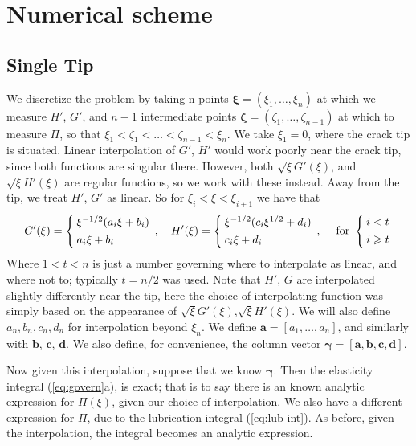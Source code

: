 \documentclass{jfm}
\begin{document}
\section{Numerical scheme}\label{sec:numerical_scheme}
%
%
\subsection{Single Tip}
We discretize the problem by taking n points $\boldsymbol{\xi} = (\xi_1, \dots
,\xi_n)$ at which we measure $H'$, $G'$, and $n-1$ intermediate points 
$\boldsymbol{\zeta} = (\zeta_1, \dots , \zeta_{n-1})$ at which to measure
$\Pi$, so that $\xi_1 < \zeta_1 < \dots < \zeta_{n-1} < \xi_n$. We take
$\xi_1 = 0$, where the crack tip is situated.
Linear interpolation of $G'$, $H'$ would work poorly near the crack tip, since
both functions are singular there. However, both $\sqrt{\xi}G'(\xi)$, and
$\sqrt{\xi}H'(\xi)$ are regular functions, so we work with these instead.
Away from the tip, we treat $H'$, $G'$ as linear. So for 
$\xi_{i} < \xi < \xi_{i+1}$ we have that
\begin{equation}
\setlength{\arraycolsep}{2pt}
G'(\xi) = \left\{ \begin{array}{l}  
\xi^{-1/2}(a_i \xi + b_i) \\[4pt]
a_i \xi + b_i
 \end{array}\right., \quad
H'(\xi) = \left\{ \begin{array}{l}  
\xi^{-1/2}(c_i \xi^{1/2} + d_i) \\[4pt]
c_i \xi + d_i
 \end{array}\right. , \quad
\; \mbox{for\ } \left\{ \begin{array}{l}  
i<t\\[4pt]
i\geq t
\end{array}\right.
\end{equation}
Where $1 < t < n$ is just a number governing where to interpolate as linear, and
where not to; typically $t = n/2$ was used. Note that $H'$, $G$ are interpolated
slightly differently near the tip, here the choice of interpolating function 
was simply based on the appearance of $\sqrt{\xi}G'(\xi)$,$\sqrt{\xi}H'(\xi)$.
We will also define $a_n,b_n,c_n,d_n$ for interpolation beyond $\xi_n$.
We define $\boldsymbol{a} = [a_1,\dots ,a_n]$, and similarly with 
$\boldsymbol{b}$, $\boldsymbol{c}$, $\boldsymbol{d}$. We also define,
for convenience, the column vector $\boldsymbol{\gamma}=[\boldsymbol{a},
\boldsymbol{b},\boldsymbol{c},\boldsymbol{d}]$.

Now given this interpolation, suppose that we know $\boldsymbol{\gamma}$.
Then the elasticity integral (\ref{eq:govern}a), is exact; 
that is to say there is an known analytic expression for $\Pi(\xi)$, given 
our choice of interpolation.
We also have a different expression for $\Pi$, due to the lubrication integral
(\ref{eq:lub-int}).
As before, given the interpolation, the integral becomes an analytic
expression.
\end{document}
